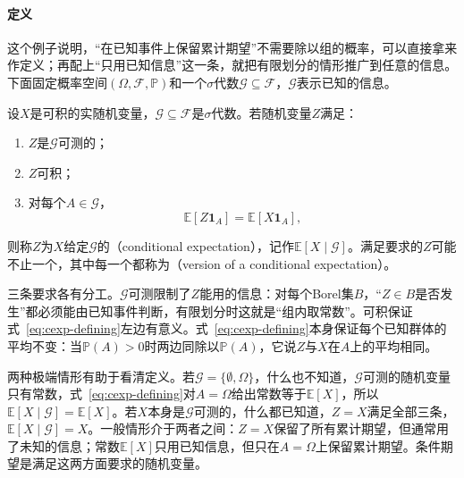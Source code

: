\paragraph{定义}
这个例子说明，“在已知事件上保留累计期望”不需要除以组的概率，可以直接拿来作定义；再配上“只用已知信息”这一条，就把有限划分的情形推广到任意的信息。下面固定概率空间$(\Omega,\mathcal{F},\mathbb{P})$和一个$\sigma$代数$\mathcal{G}\subseteq\mathcal{F}$，$\mathcal{G}$表示已知的信息。

\begin{definition}[条件期望]
\label{def:cexp-conditional-expectation}
设$X$是可积的实随机变量，$\mathcal{G}\subseteq\mathcal{F}$是$\sigma$代数。若随机变量$Z$满足：
\begin{enumerate}
 \item $Z$是$\mathcal{G}$可测的；
 \item $Z$可积；
 \item 对每个$A\in\mathcal{G}$，
 \begin{equation}
  \mathbb{E}[Z\mathbf{1}_{A}]=\mathbb{E}[X\mathbf{1}_{A}],
  \label{eq:cexp-defining}
 \end{equation}
\end{enumerate}
则称$Z$为$X$给定$\mathcal{G}$的（conditional expectation），记作$\mathbb{E}[X\mid\mathcal{G}]$。满足要求的$Z$可能不止一个，其中每一个都称为（version of a conditional expectation）。
\end{definition}

三条要求各有分工。$\mathcal{G}$可测限制了$Z$能用的信息：对每个Borel集$B$，“$Z\in B$是否发生”都必须能由已知事件判断，有限划分时这就是“组内取常数”。可积保证式~\eqref{eq:cexp-defining}左边有意义。式~\eqref{eq:cexp-defining}本身保证每个已知群体的平均不变：当$\mathbb{P}(A)>0$时两边同除以$\mathbb{P}(A)$，它说$Z$与$X$在$A$上的平均相同。

两种极端情形有助于看清定义。若$\mathcal{G}=\{\emptyset,\Omega\}$，什么也不知道，$\mathcal{G}$可测的随机变量只有常数，式~\eqref{eq:cexp-defining}对$A=\Omega$给出常数等于$\mathbb{E}[X]$，所以$\mathbb{E}[X\mid\mathcal{G}]=\mathbb{E}[X]$。若$X$本身是$\mathcal{G}$可测的，什么都已知道，$Z=X$满足全部三条，$\mathbb{E}[X\mid\mathcal{G}]=X$。一般情形介于两者之间：$Z=X$保留了所有累计期望，但通常用了未知的信息；常数$\mathbb{E}[X]$只用已知信息，但只在$A=\Omega$上保留累计期望。条件期望是满足这两方面要求的随机变量。

